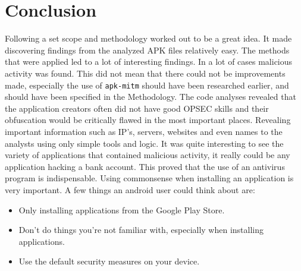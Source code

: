 \section{Conclusion}

Following a set scope and methodology worked out to be a great idea. It made discovering findings from the analyzed APK files relatively easy.
The methods that were applied led to a lot of interesting findings. 
In a lot of cases malicious activity was found. 
This did not mean that there could not be improvements made, especially the use of \texttt{apk-mitm} should have been researched earlier, and should have been specified in the Methodology.
The code analyses revealed that the application creators often did not have good OPSEC skills and their obfuscation would be critically flawed in the most important places.
Revealing important information such as IP's, servers, websites and even names to the analysts using only simple tools and logic.
It was quite interesting to see the variety of applications that contained malicious activity, it really could be any application hacking a bank account.
This proved that the use of an antivirus program is indispensable.
Using commonsense when installing an application is very important.
A few things an android user could think about are:

\begin{itemize}
    \item Only installing applications from the Google Play Store.
    \item Don't do things you're not familiar with, especially when installing applications.
    \item Use the default security measures on your device.
\end{itemize}


